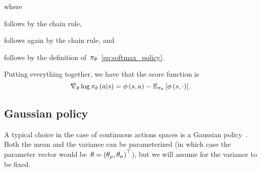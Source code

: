 where
\begin{enumerate*}[label=(\alph*)]
	\item follows by the chain rule,
	\item follows again by the chain rule, and
	\item follows by the definition of~${\pi_{\theta}}$~\eqref{eq:softmax_policy}.
\end{enumerate*}
Putting everything together, we have that the score function is
\begin{equation} \label{eq:softmax_score}
	\nabla_{\policyparameter}\log\policy_{\policyparameter}\left(\action\middle\vert\state\right)=\featurevector\left(\state,\action\right)-\mathbb{E}_{\policy_{\policyparameter}}\left[\featurevector\left(\state,\cdot\right)\right].
\end{equation}

\subsection{Gaussian policy}
A typical choice in the case of continuous actions spaces is a Gaussian policy~\cite{williams1992reinforce}. Both the mean and the variance can be parameterized (in which case the parameter vector would be~${\theta=\left(\theta_{\mu},\theta_{\sigma}\right)^{\top}}$), but we will assume for the variance to be fixed.

